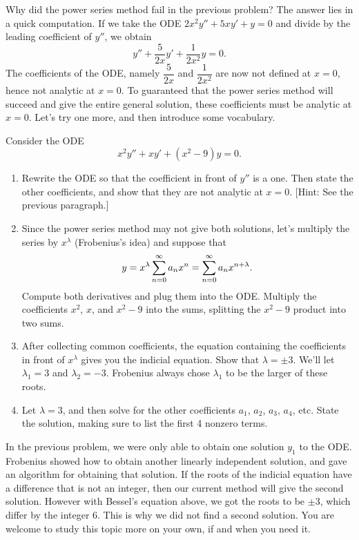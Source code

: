 Why did the power series method fail in the previous problem?  The answer lies in a quick computation.  If we take the ODE 
$2x^2y''+5xy'+y=0$
and divide by the leading coefficient of $y''$, we obtain 
$$y''+\frac{5}{2x}y'+\frac{1}{2x^2}y=0.$$
The coefficients of the ODE, namely $\dfrac{5}{2x}$ and $\dfrac{1}{2x^2}$ are now not defined at $x=0$, hence not analytic at $x=0$.  To guaranteed that the power series method will succeed and give the entire general solution, these coefficients must be analytic at $x=0$.  Let's try one more, and then introduce some vocabulary.   








\begin{problem}
 Consider the ODE  $$x^2y''+xy'+(x^2-9)y=0.$$
\begin{enumerate}
 \item Rewrite the ODE so that the coefficient in front of $y''$ is a one.  Then state the other coefficients, and show that they are not analytic at $x=0$. [Hint: See the previous paragraph.]
 \item Since the power series method may not give both solutions, let's multiply the series by $x^\lambda$ (Frobenius's idea) and suppose that $$\displaystyle y=x^\lambda \sum_{n=0}^\infty a_n x^n = \sum_{n=0}^\infty a_n x^{n+\lambda}.$$ Compute both derivatives and plug them into the ODE. Multiply the coefficients $x^2$, $x$, and $x^2-9$ into the sums, splitting the $x^2-9$ product into two sums. %
 \item After collecting common coefficients, the equation containing the coefficients in front of $x^{\lambda}$ gives you the indicial equation. Show that $\lambda = \pm 3$. We'll let $\lambda_1=3$ and $\lambda_2=-3$.  Frobenius always chose $\lambda_1$ to be the larger of these roots.
 \item Let $\lambda =3$, and then solve for the other coefficients $a_1$, $a_2$, $a_3$, $a_4$, etc. State the solution, making sure to list the first 4 nonzero terms. 
\end{enumerate}

\end{problem}

In the previous problem, we were only able to obtain one solution $y_1$ to the ODE. Frobenius showed how to obtain another linearly independent solution, and gave an algorithm for obtaining that solution.  If the roots of the indicial equation have a difference that is not an integer, then our current method will give the second solution. However with Bessel's equation above, we got the roots to be $\pm 3$, which differ by the integer 6.  This is why we did not find a second solution. You are welcome to study this topic more on your own, if and when you need it. 

